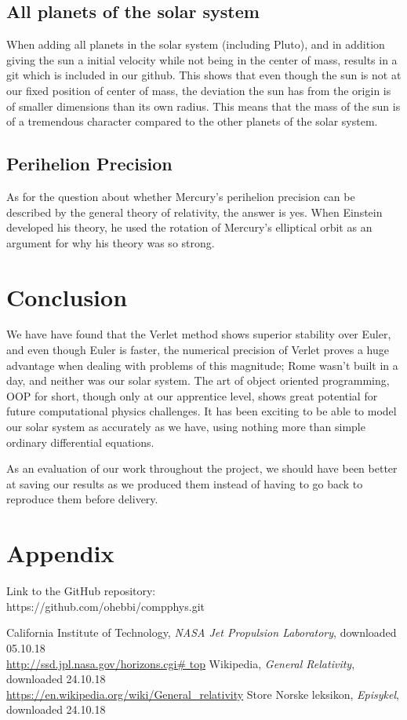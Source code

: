 \documentclass{article}
\begin{document}
\subsection{All planets of the solar system}
When adding all planets in the solar system (including Pluto), and in addition giving the sun a initial velocity while not being in the center of mass, results in a git which is included in our github. This shows that even though the sun is not at our fixed position of center of mass, the deviation the sun has from the origin is of smaller dimensions than its own radius. This means that the mass of the sun is of a tremendous character compared to the other planets of the solar system.

\subsection{Perihelion Precision}
\vskip0.5cm
As for the question about whether Mercury's perihelion precision can be described by the general theory of relativity, the answer is yes. When Einstein developed his theory, he used the rotation of Mercury's elliptical orbit as an argument for why his theory was so strong. \cite{wiki_rel}


\section{Conclusion}

We have have found that the Verlet method shows superior stability over Euler, and even though Euler is faster, the numerical precision of Verlet proves a huge advantage when dealing with problems of this magnitude; Rome wasn't built in a day, and neither was our solar system. The art of object oriented programming, OOP for short, though only at our apprentice level, shows great potential for future computational physics challenges. It has been exciting to be able to model our solar system as accurately as we have, using nothing more than simple ordinary differential equations. 

As an evaluation of our work throughout the project, we should have been better at saving our results as we produced them instead of having to go back to reproduce them before delivery.


\section{Appendix}
Link to the GitHub repository:\\

https://github.com/ohebbi/compphys.git

\begin{thebibliography}{}
California Institute of Technology, \textit{NASA Jet Propulsion Laboratory}, downloaded 05.10.18\\
\url{http://ssd.jpl.nasa.gov/horizons.cgi# top}
Wikipedia, \textit{General Relativity}, downloaded 24.10.18\\
\url{https://en.wikipedia.org/wiki/General_relativity}
Store Norske leksikon, \textit{Episykel}, downloaded 24.10.18\\
\end{thebibliography}
\end{document}
